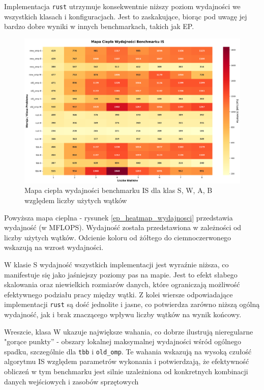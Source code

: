 Implementacja \texttt{rust} utrzymuje konsekwentnie niższy poziom wydajności we wszystkich klasach i konfiguracjach. Jest to zaskakujące, biorąc pod uwagę jej bardzo dobre wyniki w innych benchmarkach, takich jak EP.
\begin{figure}[H]
    \centering
    \includegraphics[width=\textwidth]{analiza/images/parallel/is/arm/is_mapa_ciepla_wydajnosci.png}
    \caption{Mapa ciepła wydajności benchmarku IS dla klas S, W, A, B względem liczby użytych wątków}
    \label{is_heatmap_wydajnosci}
\end{figure}
Powyższa mapa cieplna - rysunek \ref{ep_heatmap_wydajnosci} przedstawia wydajność (w MFLOPS). Wydajność została przedstawiona w zależności od liczby użytych wątków. Odcienie koloru od żółtego do ciemnoczerwonego wskazują na wzrost wydajności.

W klasie S wydajność wszystkich implementacji jest wyraźnie niższa, co manifestuje się jako jaśniejszy poziomy pas na mapie. Jest to efekt słabego skalowania oraz niewielkich rozmiarów danych, które ograniczają możliwość efektywnego podziału pracy między wątki. Z kolei wiersze odpowiadające implementacji \texttt{rust} są dość jednolite i jasne, co potwierdza zarówno niższą ogólną wydajność, jak i brak znaczącego wpływu liczby wątków na wynik końcowy.

Wreszcie, klasa W ukazuje największe wahania, co dobrze ilustrują nieregularne "gorące punkty” - obszary lokalnej maksymalnej wydajności wśród ogólnego spadku, szczególnie dla \texttt{tbb} i \texttt{old\_omp}. Te wahania wskazują na wysoką czułość algorytmu IS względem parametrów wykonania i potwierdzają, że efektywność obliczeń w tym benchmarku jest silnie uzależniona od konkretnych kombinacji danych wejściowych i zasobów sprzętowych

